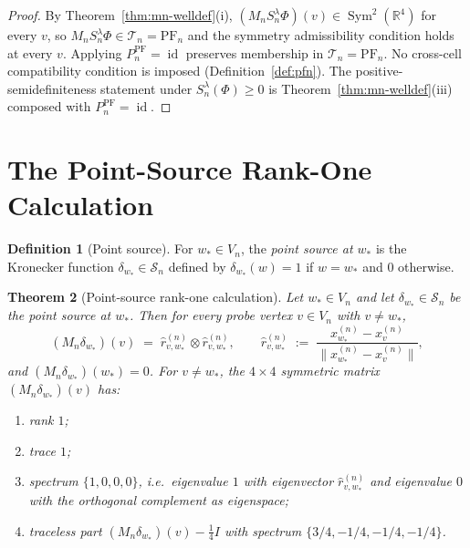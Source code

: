 \documentclass[11pt, a4paper]{amsart}
\newtheorem{theorem}{Theorem}[section]
\theoremstyle{definition}
\newtheorem{definition}[theorem]{Definition}
\newcommand{\R}{\mathbb{R}}
\newcommand{\id}{\operatorname{id}}
\newcommand{\Sym}{\operatorname{Sym}}
\newcommand{\PF}{\mathrm{PF}}
\begin{document}
\begin{proof}
By Theorem~\ref{thm:mn-welldef}(i), $(M_n S_n^\lambda \Phi)(v) \in
\Sym^2(\R^4)$ for every $v$, so
$M_n S_n^\lambda \Phi \in \mathcal T_n = \PF_n$ and the symmetry
admissibility condition holds at every $v$. Applying
$P_n^\PF = \id$ preserves membership in $\mathcal T_n = \PF_n$.
No cross-cell compatibility condition is imposed
(Definition~\ref{def:pfn}). The positive-semidefiniteness
statement under $S_n^\lambda(\Phi) \geq 0$ is
Theorem~\ref{thm:mn-welldef}(iii) composed with $P_n^\PF = \id$.
\end{proof}

\section{The Point-Source Rank-One Calculation}
\label{sec:point-source}

\begin{definition}[Point source]
\label{def:point-source}
For $w_\ast \in V_n$, the \emph{point source at $w_\ast$} is the
Kronecker function $\delta_{w_\ast} \in \mathcal S_n$ defined by
$\delta_{w_\ast}(w) = 1$ if $w = w_\ast$ and $0$ otherwise.
\end{definition}

\begin{theorem}[Point-source rank-one calculation]
\label{thm:point-source}
Let $w_\ast \in V_n$ and let $\delta_{w_\ast} \in \mathcal S_n$
be the point source at $w_\ast$. Then for every probe vertex
$v \in V_n$ with $v \neq w_\ast$,
\[
  (M_n \delta_{w_\ast})(v)
    \;=\; \hat r_{v, w_\ast}^{(n)}
       \otimes \hat r_{v, w_\ast}^{(n)},
  \qquad
  \hat r_{v, w_\ast}^{(n)}
    \;:=\; \frac{x_{w_\ast}^{(n)} - x_v^{(n)}}
      {\|x_{w_\ast}^{(n)} - x_v^{(n)}\|},
\]
and $(M_n \delta_{w_\ast})(w_\ast) = 0$. For $v \neq w_\ast$, the
$4 \times 4$ symmetric matrix $(M_n \delta_{w_\ast})(v)$ has:
\begin{enumerate}
\item[\textup{(i)}] rank $1$;
\item[\textup{(ii)}] trace $1$;
\item[\textup{(iii)}] spectrum $\{1, 0, 0, 0\}$, i.e.\ eigenvalue
  $1$ with eigenvector $\hat r_{v, w_\ast}^{(n)}$ and eigenvalue
  $0$ with the orthogonal complement as eigenspace;
\item[\textup{(iv)}] traceless part
  $(M_n \delta_{w_\ast})(v) - \tfrac{1}{4}I$ with spectrum
  $\{3/4, -1/4, -1/4, -1/4\}$.
\end{enumerate}
\end{theorem}
\end{document}

